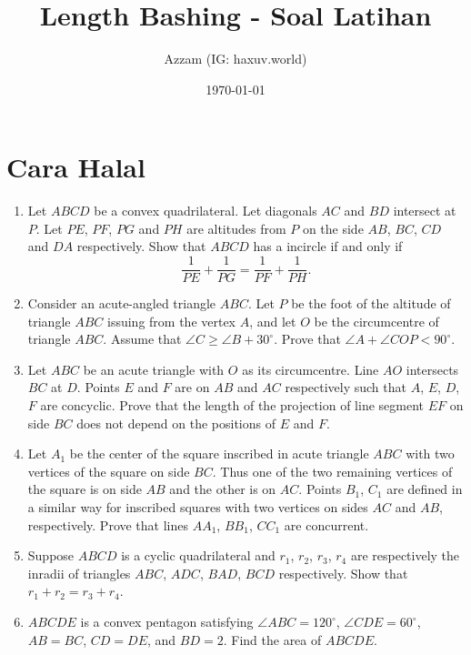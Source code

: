 \documentclass[12pt]{scrartcl}
\title{Length Bashing - Soal Latihan}
\author{Azzam (IG: haxuv.world)}
\date{\today}
\begin{document}
\maketitle

\renewcommand*\contentsname{Daftar Isi}
\tableofcontents

\newpage
\section{Cara Halal}
\begin{enumerate}
    \item Let $ABCD$ be a convex quadrilateral. Let diagonals $AC$ and $BD$ intersect at $P$. Let $PE$, $PF$, $PG$ and $PH$ are altitudes from $P$ on the side $AB$, $BC$, $CD$ and $DA$ respectively. Show that $ABCD$ has a incircle if and only if
    $$\dfrac{1}{PE}+\dfrac{1}{PG}=\dfrac{1}{PF}+\dfrac{1}{PH}.$$

    \item Consider an acute-angled triangle $ABC$. Let $P$ be the foot of the altitude of triangle $ABC$ issuing from the vertex $A$, and let $O$ be the circumcentre of triangle $ABC$. Assume that $\angle C \geq \angle B + 30^\circ$. Prove that $\angle A + \angle COP < 90^\circ$.

    \item Let $ABC$ be an acute triangle with $O$ as its circumcentre. Line $AO$ intersects $BC$ at $D$. Points $E$ and $F$ are on $AB$ and $AC$ respectively such that $A$, $E$, $D$, $F$ are concyclic. Prove that the length of the projection of line segment $EF$ on side $BC$ does not depend on the positions of $E$ and $F$.

    \item Let $A_1$ be the center of the square inscribed in acute triangle $ABC$ with two vertices of the square on side $BC$. Thus one of the two remaining vertices of the square is on side $AB$ and the other is on $AC$. Points $B_1$, $C_1$ are defined in a similar way for inscribed squares with two vertices on sides $AC$ and $AB$, respectively. Prove that lines $AA_1$, $BB_1$, $CC_1$ are concurrent.

    \item Suppose $ABCD$ is a cyclic quadrilateral and $r_1$, $r_2$, $r_3$, $r_4$ are respectively the inradii of triangles $ABC$, $ADC$, $BAD$, $BCD$ respectively. Show that $r_1 + r_2 = r_3 + r_4$.

    \item $ABCDE$ is a convex pentagon satisfying $\angle ABC = 120^\circ$, $\angle CDE = 60^\circ$, $AB = BC$, $CD = DE$, and $BD = 2$. Find the area of $ABCDE$.


\end{enumerate}
\end{document}

